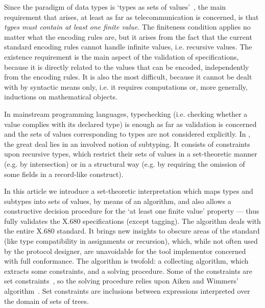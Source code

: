 Since the paradigm of \ASN data types is `types as sets of
values'~\cite{Mortazavi:1996}, the main requirement that arises, at
least as far as telecommunication is concerned, is that \emph{types
must contain at least one finite value}. The finiteness condition
applies no matter what the encoding rules are, but it arises from the
fact that the current standard encoding rules cannot handle infinite
values, i.e. recursive values. The existence requirement is the main
aspect of the validation of \ASN specifications, because it is
directly related to the values that can be encoded, independently from
the encoding rules. It is also the most difficult, because it cannot
be dealt with by syntactic means only, i.e. it requires computations
or, more generally, inductions on mathematical objects.

In mainstream programming languages, typechecking (i.e. checking
whether a value complies with its declared type) is enough as far as
validation is concerned and the sets of values corresponding to types
are not considered explicitly. In \ASN, the great deal lies in an
involved notion of subtyping. It consists of constraints upon
recursive types, which restrict their sets of values in a
set-theoretic manner (e.g. by intersection) or in a structural way
(e.g. by requiring the omission of some fields in a record-like
construct).

In this article we introduce a set-theoretic interpretation which maps
types and subtypes into sets of values, by means of an algorithm, and
also allows a constructive decision procedure for the `at least one
finite value' property --- thus fully validates the \mbox{X.680}
specifications (except tagging). The algorithm deals with the entire
\mbox{X.680} standard. It brings new insights to obscure areas of the
standard (like type compatibility in assignments or recursion),
which, while not often used by the protocol designer, are unavoidable
for the tool implementor concerned with full conformance. The
algorithm is twofold: a collecting algorithm, which extracts some
constraints, and a solving procedure. Some of the constraints are set
constraints~\cite{Aiken:1994,PacholskiPodelski:1997}, so the solving
procedure relies upon Aiken and Wimmers'
algorithm~\cite{AikenWimmers:1992}. Set constraints are inclusions
between expressions interpreted over the domain of sets of trees.

